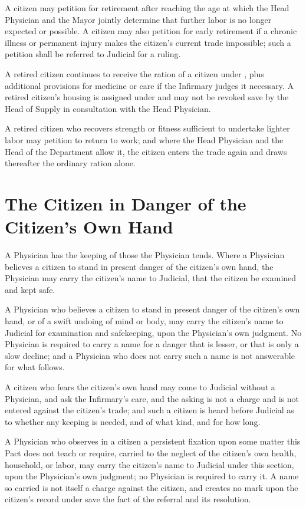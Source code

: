 \begin{clauses}
\item A citizen may petition for retirement after reaching the age at which the Head Physician and the Mayor jointly determine that further labor is no longer expected or possible. A citizen may also petition for early retirement if a chronic illness or permanent injury makes the citizen's current trade impossible; such a petition shall be referred to Judicial for a ruling.
\item A retired citizen continues to receive the ration of a citizen under , plus additional provisions for medicine or care if the Infirmary judges it necessary. A retired citizen's housing is assigned under  and may not be revoked save by the Head of Supply in consultation with the Head Physician.
\item A retired citizen who recovers strength or fitness sufficient to undertake lighter labor may petition to return to work; and where the Head Physician and the Head of the Department allow it, the citizen enters the trade again and draws thereafter the ordinary ration alone.
\end{clauses}

\section{The Citizen in Danger of the Citizen's Own Hand}
\label{sec:health:citizen-in-danger-of-own-hand}

A Physician has the keeping of those the Physician tends. Where a Physician believes a citizen to stand in present danger of the citizen's own hand, the Physician may carry the citizen's name to Judicial, that the citizen be examined and kept safe.

\begin{clauses}
\item A Physician who believes a citizen to stand in present danger of the citizen's own hand, or of a swift undoing of mind or body, may carry the citizen's name to Judicial for examination and safekeeping, upon the Physician's own judgment. No Physician is required to carry a name for a danger that is lesser, or that is only a slow decline; and a Physician who does not carry such a name is not answerable for what follows.
\item A citizen who fears the citizen's own hand may come to Judicial without a Physician, and ask the Infirmary's care, and the asking is not a charge and is not entered against the citizen's trade; and such a citizen is heard before Judicial as to whether any keeping is needed, and of what kind, and for how long.
\item A Physician who observes in a citizen a persistent fixation upon some matter this Pact does not teach or require, carried to the neglect of the citizen's own health, household, or labor, may carry the citizen's name to Judicial under this section, upon the Physician's own judgment; no Physician is required to carry it. A name so carried is not itself a charge against the citizen, and creates no mark upon the citizen's record under  save the fact of the referral and its resolution.
\end{clauses}

